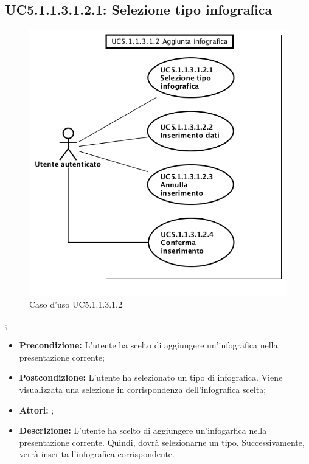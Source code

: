 \subsection{ UC5.1.1.3.1.2.1: Selezione tipo infografica}

\begin{figure}[h]
	\begin{center}
	\includegraphics[scale=0.4]{diagram/UC5-1-1-3-1-2.png}
	\caption{Caso d'uso UC5.1.1.3.1.2}
	\end{center}
\end{figure};
\begin{itemize}
	\item \textbf{Precondizione:} L'utente ha scelto di aggiungere un'infografica nella presentazione corrente;
	\item \textbf{Postcondizione:} L'utente ha selezionato un tipo di infografica. Viene visualizzata una selezione in corrispondenza dell'infografica scelta;
	\item \textbf{Attori:} ;
	\item \textbf{Descrizione:} L'utente ha scelto di aggiungere un'infogarfica nella presentazione corrente. Quindi, dovrà selezionarne un tipo. Successivamente, verrà inserita l'infografica corrispondente.
\end{itemize}
